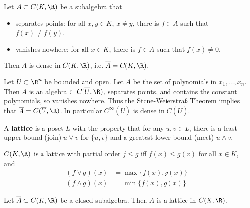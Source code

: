 \documentclass{article}
\begin{document}
\begin{thm}
    Let $A \subset C(K, \R)$ be a subalgebra that
    \begin{itemize}
        \item separates points: for all $x, y \in K$, $x \neq y$, there is $f \in A$ such that $f(x) \neq f(y)$.
        \item vanishes nowhere: for all $x \in K$, there is $f \in A$ such that $f(x) \neq 0$.
    \end{itemize}
    Then $A$ is dense in $C(K, \R)$, i.e. $\overline{A} = C(K, \R)$.
\end{thm}

\begin{eg}
    Let $U \subset \R^n$ be bounded and open.
    Let $A$ be the set of polynomials in $x_1, \dotsc, x_n$.
    Then $A$ is an algebra $\subset C(\overline{U}, \R)$, separates points, and contains the constant polynomials, so vanishes nowhere.
    Thus the Stone-Weierstra{\ss} Theorem implies that $\overline{A} = C(\overline{U}, \R)$.
    In particular $C^\infty(\overline{U})$ is dense in $C(\overline{U})$.
\end{eg}

\begin{defi}
    A \textbf{lattice} is a poset $L$ with the property that for any $u, v \in L$, there is a least upper bound (join) $u \vee v$ for $\{u, v\}$ and a greatest lower bound (meet) $u \wedge v$.
\end{defi}

\begin{eg}
    $C(K, \R)$ is a lattice with partial order $f \leq g$ iff $f(x) \leq g(x)$ for all $x \in K$, and
    \begin{align*}
        (f \vee g)(x) &= \max\{f(x), g(x)\} \\
        (f \wedge g)(x) &= \min\{f(x), g(x)\}.
    \end{align*}
\end{eg}

\begin{lemma}
    Let $\overline{A} \subset C(K, \R)$ be a closed subalgebra.
    Then $\overline{A}$ is a lattice in $C(K, \R)$.
\end{lemma}
\end{document}

